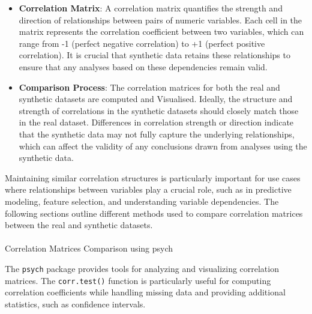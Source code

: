 \documentclass[
  letterpaper,
  DIV=11,
  numbers=noendperiod]{scrartcl}
\makeatletter
\let\oldparagraph\paragraph
\renewcommand{\paragraph}{
    \@ifstar
      \xxxParagraphStar
      \xxxParagraphNoStar
  }
\newcommand{\xxxParagraphStar}[1]{\oldparagraph*{#1}\mbox{}}
\newcommand{\xxxParagraphNoStar}[1]{\oldparagraph{#1}\mbox{}}
\makeatother
\begin{document}
\begin{itemize}
\item
  \textbf{Correlation Matrix}: A correlation matrix quantifies the
  strength and direction of relationships between pairs of numeric
  variables. Each cell in the matrix represents the correlation
  coefficient between two variables, which can range from -1 (perfect
  negative correlation) to +1 (perfect positive correlation). It is
  crucial that synthetic data retains these relationships to ensure that
  any analyses based on these dependencies remain valid.
\item
  \textbf{Comparison Process}: The correlation matrices for both the
  real and synthetic datasets are computed and Visualised. Ideally, the
  structure and strength of correlations in the synthetic datasets
  should closely match those in the real dataset. Differences in
  correlation strength or direction indicate that the synthetic data may
  not fully capture the underlying relationships, which can affect the
  validity of any conclusions drawn from analyses using the synthetic
  data.
\end{itemize}

Maintaining similar correlation structures is particularly important for
use cases where relationships between variables play a crucial role,
such as in predictive modeling, feature selection, and understanding
variable dependencies. The following sections outline different methods
used to compare correlation matrices between the real and synthetic
datasets.

\paragraph{Correlation Matrices Comparison using
psych}\label{correlation-matrices-comparison-using-psych}

The \texttt{psych} package provides tools for analyzing and visualizing
correlation matrices. The \texttt{corr.test()} function is particularly
useful for computing correlation coefficients while handling missing
data and providing additional statistics, such as confidence intervals.
\end{document}

